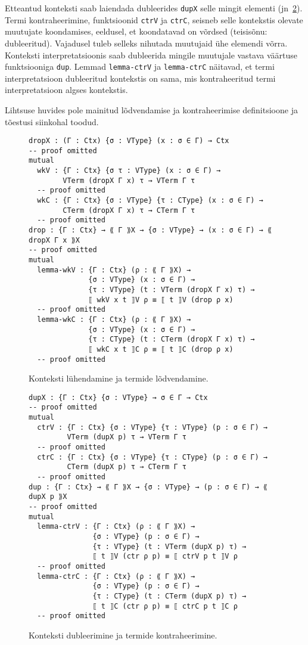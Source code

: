 \documentclass[a4paper,12pt]{article}
\begin{document}
Etteantud konteksti saab laiendada dubleerides {\tt dupX} selle mingit elementi (jn~\ref{fig:contraction}).
Termi kontraheerimine, funktsioonid {\tt ctrV} ja {\tt ctrC}, seisneb selle kontekstis olevate muutujate koondamises, eeldusel, et koondatavad on võrdsed (teisisõnu: dubleeritud).
Vajadusel tuleb selleks nihutada muutujaid ühe elemendi võrra.
Konteksti interpretatsioonis saab dubleerida mingile muutujale vastava väärtuse funktsiooniga {\tt dup}.
Lemmad {\tt lemma-ctrV} ja {\tt lemma-ctrC} näitavad, et termi interpretatsioon dubleeritud kontekstis on sama, mis kontraheeritud termi interpretatsioon algses kontekstis.

Lihtsuse huvides pole mainitud lõdvendamise ja kontraheerimise definitsioone ja tõestusi siinkohal toodud.
\begin{figure}
  \begin{BVerbatim}
dropX : (Γ : Ctx) {σ : VType} (x : σ ∈ Γ) → Ctx
-- proof omitted
mutual
  wkV : {Γ : Ctx} {σ τ : VType} (x : σ ∈ Γ) →
        VTerm (dropX Γ x) τ → VTerm Γ τ
  -- proof omitted
  wkC : {Γ : Ctx} {σ : VType} {τ : CType} (x : σ ∈ Γ) →
        CTerm (dropX Γ x) τ → CTerm Γ τ
  -- proof omitted
drop : {Γ : Ctx} → ⟪ Γ ⟫X → {σ : VType} → (x : σ ∈ Γ) → ⟪ dropX Γ x ⟫X 
-- proof omitted
mutual
  lemma-wkV : {Γ : Ctx} (ρ : ⟪ Γ ⟫X) →
              {σ : VType} (x : σ ∈ Γ) →
              {τ : VType} (t : VTerm (dropX Γ x) τ) →
              ⟦ wkV x t ⟧V ρ ≡ ⟦ t ⟧V (drop ρ x)
  -- proof omitted
  lemma-wkC : {Γ : Ctx} (ρ : ⟪ Γ ⟫X) →
              {σ : VType} (x : σ ∈ Γ) →
              {τ : CType} (t : CTerm (dropX Γ x) τ) →
              ⟦ wkC x t ⟧C ρ ≡ ⟦ t ⟧C (drop ρ x)
  -- proof omitted
\end{BVerbatim}
  \caption{Konteksti lühendamine ja termide lõdvendamine.}
  \label{fig:weakening}
\end{figure}

\begin{figure}
  \begin{BVerbatim}
dupX : {Γ : Ctx} {σ : VType} → σ ∈ Γ → Ctx
-- proof omitted
mutual
  ctrV : {Γ : Ctx} {σ : VType} {τ : VType} (p : σ ∈ Γ) →
         VTerm (dupX p) τ → VTerm Γ τ
  -- proof omitted
  ctrC : {Γ : Ctx} {σ : VType} {τ : CType} (p : σ ∈ Γ) →
         CTerm (dupX p) τ → CTerm Γ τ
  -- proof omitted
dup : {Γ : Ctx} → ⟪ Γ ⟫X → {σ : VType} → (p : σ ∈ Γ) → ⟪ dupX p ⟫X
-- proof omitted
mutual
  lemma-ctrV : {Γ : Ctx} (ρ : ⟪ Γ ⟫X) →
               {σ : VType} (p : σ ∈ Γ) →
               {τ : VType} (t : VTerm (dupX p) τ) →
               ⟦ t ⟧V (ctr ρ p) ≡ ⟦ ctrV p t ⟧V ρ
  -- proof omitted
  lemma-ctrC : {Γ : Ctx} (ρ : ⟪ Γ ⟫X) →
               {σ : VType} (p : σ ∈ Γ) →
               {τ : CType} (t : CTerm (dupX p) τ) →
               ⟦ t ⟧C (ctr ρ p) ≡ ⟦ ctrC p t ⟧C ρ
  -- proof omitted
  \end{BVerbatim}
  \caption{Konteksti dubleerimine ja termide kontraheerimine.}
  \label{fig:contraction}
\end{figure}
\end{document}
